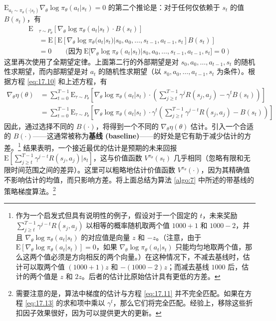 $\mathrm{E}_{a_t \sim \pi_\theta(\cdot|s_t)} \nabla_\theta \log \pi_\theta(a_t|s_t) = 0$ 的第二个推论是：对于任何仅依赖于 $s_t$ 的值 $B(s_t)$，有
\begin{align*}
    \mathrm{E}&_{\tau \sim P_\theta} \left[ \nabla_\theta \log \pi_\theta(a_t|s_t) \cdot B(s_t) \right] \\
    &= \mathrm{E} \left[ \mathrm{E} \left[ \nabla_\theta \log \pi_\theta(a_t|s_t) | s_0, a_0, \dots, s_{t-1}, a_{t-1}, s_t \right] B(s_t) \right]\\
    &= 0 \qquad (\text{因为}\ \mathrm{E} [\nabla_\theta \log \pi_\theta(a_t|s_t) | s_0, a_0, \dots, s_{t-1}, a_{t-1}, s_t] = 0)
\end{align*}
这里再次使用了全期望定律。上面第二行的外部期望是对 $s_0, a_0, \dots, a_{t-1}, s_t$ 的随机性求期望，而内部期望是对 $a_t$ 的随机性求期望（以 $s_0, a_0, \dots, a_{t-1}, s_t$ 为条件）。根据方程 \eqref{eq:17.10} 和上述方程，有
\begin{align}
    \nabla_\theta \eta(\theta) &= \sum_{t=0}^{T-1} \mathrm{E}_{\tau \sim P_\theta} \left[ \nabla_\theta \log \pi_\theta(a_t|s_t) \cdot \left( \sum_{j \ge t}^{T-1} \gamma^j R(s_j, a_j) - \gamma^t B(s_t) \right) \right] \nonumber \\
    &= \sum_{t=0}^{T-1} \mathrm{E}_{\tau \sim P_\theta} \left[ \nabla_\theta \log \pi_\theta(a_t|s_t) \cdot \gamma^t \left( \sum_{j \ge t}^{T-1} \gamma^{j-t} R(s_j, a_j) - B(s_t) \right) \right] \label{eq:17.11}
\end{align}
因此，通过选择不同的 $B(\cdot)$，将得到一个不同的 $\nabla_\theta \eta(\theta)$ 估计。引入一个合适的 $B(\cdot)$——这通常被称为\textbf{基线 (baseline)}——的好处是它有助于减少估计的方差。\footnote{作为一个启发式但具有说明性的例子，假设对于一个固定的 $t$，未来奖励 $\sum_{j \ge t}^{T-1} \gamma^{j-t} R(s_j, a_j)$ 以相等的概率随机取两个值 $1000 + 1$ 和 $1000 - 2$，并且 $\nabla_\theta \log \pi_\theta(a_t|s_t)$ 的对应值是向量 $z$ 和 $-z$。（注意，由于 $\mathrm{E}[\nabla_\theta \log \pi_\theta(a_t|s_t)] = 0$，如果 $\nabla_\theta \log \pi_\theta(a_t|s_t)$ 只能均匀地取两个值，那么这两个值必须是方向相反的两个向量。）在这种情况下，不减去基线时，估计可以取两个值 $(1000 + 1)z$ 和 $-(1000 - 2)z$；而减去基线 $1000$ 后，估计的两个值是 $z$ 和 $2z$。后者的估计比原始估计具有更低的方差。} 结果表明，一个接近最优的估计是预期的未来回报 $\mathrm{E} \left[ \sum_{j \ge t}^{T-1} \gamma^{j-t} R(s_j, a_j) | s_t \right]$，这与价值函数 $V^{\pi_\theta}(s_t)$ 几乎相同（忽略有限和无限时间范围之间的差异）。这里可以粗略地估计价值函数 $V^{\pi_\theta}(\cdot)$，因为其精确值不影响估计的均值，而只影响方差。将上面总结为算法 \ref{algo:7} 中所述的带基线的策略梯度算法。\footnote{需要注意的是，算法中梯度的估计与方程 \eqref{eq:17.11} 并不完全匹配。如果在方程 \eqref{eq:17.13} 的求和项中乘以 $\gamma^t$，那么它们将完全匹配。经验上，移除这些折扣因子效果很好，因为可以提供更大的更新。}

